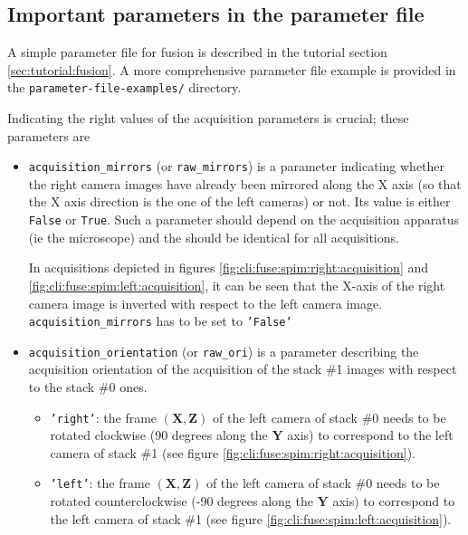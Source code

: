 \subsection{Important parameters in the parameter file}
\label{sec:cli:fuse:important:parameters}

A simple parameter file for fusion is described in the tutorial
section \ref{sec:tutorial:fusion}. A more comprehensive parameter file
example is provided in the \texttt{parameter-file-examples/} directory.

Indicating the right values of the
acquisition parameters is crucial; these parameters are
\begin{itemize}
\itemsep -0.5ex
\item \texttt{acquisition\_mirrors}  (or \texttt{raw\_mirrors}) is a parameter indicating whether the right camera images have already been mirrored along the X axis (so that the X axis direction is the one of the left cameras) or not. Its value is either \texttt{False} or \texttt{True}. Such a parameter should depend on the acquisition apparatus (ie the microscope) and the should be identical for all acquisitions.

In acquisitions depicted in figures \ref{fig:cli:fuse:spim:right:acquisition} and \ref{fig:cli:fuse:spim:left:acquisition}, it can be seen that the X-axis of the right camera image is inverted with respect to the left camera image. \texttt{acquisition\_mirrors} has to be set to \texttt{'False'}
  
  
\item \texttt{acquisition\_orientation} (or \texttt{raw\_ori}) is a parameter describing the acquisition orientation of the acquisition of the stack \#1 images with respect to the stack \#0 ones. 

\begin{itemize}
\itemsep -0.5ex
\item \texttt{'right'}: the frame $(\mathbf{X}, \mathbf{Z})$ of the left camera of stack \#0 needs to be rotated clockwise (90 degrees along the $\mathbf{Y}$ axis) to correspond to the left camera of stack \#1 (see figure \ref{fig:cli:fuse:spim:right:acquisition}).
\item \texttt{'left'}: the frame $(\mathbf{X}, \mathbf{Z})$ of the left camera of stack \#0 needs to be rotated counterclockwise (-90 degrees along the $\mathbf{Y}$ axis) to correspond to the left camera of stack \#1 (see figure \ref{fig:cli:fuse:spim:left:acquisition}).
\end{itemize}


\end{itemize}
